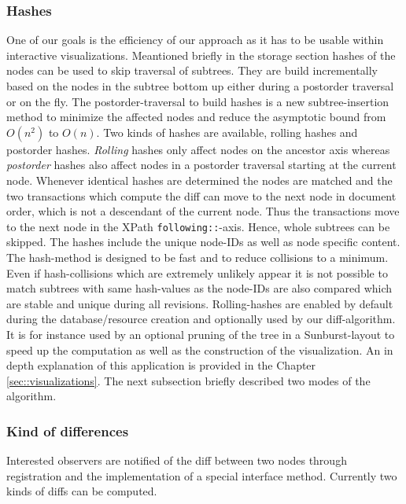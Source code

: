 \subsubsection{Hashes} One of our goals is the efficiency of our approach as it has to be usable within interactive visualizations. Meantioned briefly in the storage section hashes of the nodes can be used to skip traversal of subtrees. They are build incrementally based on the nodes in the subtree bottom up either during a postorder traversal or on the fly. The postorder-traversal to build hashes is a new subtree-insertion method to minimize the affected nodes and reduce the asymptotic bound from $O(n^2)$ to $O(n)$. Two kinds of hashes are available, rolling hashes and postorder hashes. \emph{Rolling} hashes only affect nodes on the ancestor axis whereas \emph{postorder} hashes also affect nodes in a postorder traversal starting at the current node. Whenever identical hashes are determined the nodes are matched and the two transactions which compute the diff can move to the next node in document order, which is not a descendant of the current node. Thus the transactions move to the next node in the XPath \texttt{following::}-axis. Hence, whole subtrees can be skipped. The hashes include the unique node-IDs as well as node specific content. The hash-method is designed to be fast and to reduce collisions to a minimum. Even if hash-collisions which are extremely unlikely appear it is not possible to match subtrees with same hash-values as the node-IDs are also compared which are stable and unique during all revisions. Rolling-hashes are enabled by default during the database/resource creation and optionally used by our diff-algorithm. It is for instance used by an optional pruning of the tree in a Sunburst-layout to speed up the computation as well as the construction of the visualization. An in depth explanation of this application is provided in the Chapter \ref{sec::visualizations}. The next subsection briefly described two modes of the algorithm.

\subsubsection{Kind of differences} Interested observers are notified of the diff between two nodes through registration and the implementation of a special interface method. Currently two kinds of diffs can be computed.

